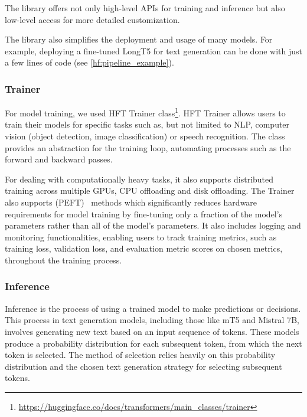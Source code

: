 \documentclass[english, ba, kiv, he, iso690numb, pdf, viewonly]{fasthesis}
\begin{document}
The library offers not only high-level APIs for training and inference but also low-level access for more detailed customization.

The library also simplifies the deployment and usage of many models. For example, deploying a fine-tuned LongT5 for text generation can be done with just a few lines of code (see \ref{hf:pipeline_example}).

\subsubsection{Trainer} \label{hf:trainer}
For model training, we used HFT Trainer class\footnote{\url{https://huggingface.co/docs/transformers/main_classes/trainer}}. HFT Trainer allows users to train their models for specific tasks such as, but not limited to NLP, computer vision (object detection, image classification) or speech recognition.
The class provides an abstraction for the training loop, automating processes such as the forward and backward passes.

For dealing with computationally heavy tasks, it also supports distributed training across multiple GPUs, CPU offloading and disk offloading. The Trainer also supports  (PEFT)~\cite{peft} methods which significantly reduces hardware requirements for model training by fine-tuning only a fraction of the model's parameters rather than all of the model's parameters.
It also includes logging and monitoring functionalities, enabling users to track training metrics, such as training loss, validation loss, and evaluation metric scores on chosen metrics, throughout the training process.

\subsubsection{Inference} \label{impl:hf:inference}
Inference is the process of using a trained model to make predictions or decisions.
This process in text generation models, including those like mT5 and Mistral 7B, involves generating new text based on an input sequence of tokens. These models produce a probability distribution for each subsequent token, from which the next token is selected. The method of selection relies heavily on this probability distribution and the chosen text generation strategy for selecting subsequent tokens.
\end{document}
